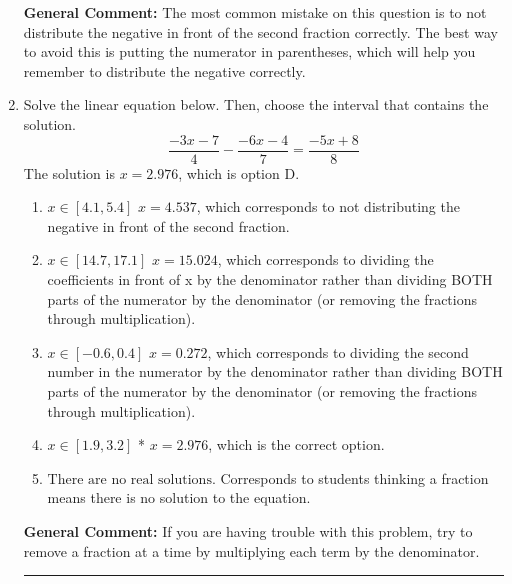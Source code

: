 \documentclass{extbook}[14pt]
\newcommand{\litem}[1]{\item #1

\rule{\textwidth}{0.4pt}}
\begin{document}
\begin{enumerate}
{\textbf{General Comment:} The most common mistake on this question is to not distribute the negative in front of the second fraction correctly. The best way to avoid this is putting the numerator in parentheses, which will help you remember to distribute the negative correctly.
}

\litem{
Solve the linear equation below. Then, choose the interval that contains the solution.
\[ \frac{-3x -7}{4} - \frac{-6x -4}{7} = \frac{-5x + 8}{8} \]
The solution is \( x = 2.976 \), which is option D.\begin{enumerate}[label=\Alph*.]
\item \( x \in [4.1, 5.4] \)
 $x = 4.537$, which corresponds to not distributing the negative in front of the second fraction.
\item \( x \in [14.7, 17.1] \)
 $x = 15.024$, which corresponds to dividing the coefficients in front of x by the denominator rather than dividing BOTH parts of the numerator by the denominator (or removing the fractions through multiplication).
\item \( x \in [-0.6, 0.4] \)
 $x = 0.272$, which corresponds to dividing the second number in the numerator by the denominator rather than dividing BOTH parts of the numerator by the denominator (or removing the fractions through multiplication).
\item \( x \in [1.9, 3.2] \)
* $x = 2.976$, which is the correct option.
\item \( \text{There are no real solutions.} \)
Corresponds to students thinking a fraction means there is no solution to the equation.
\end{enumerate}

\textbf{General Comment:} If you are having trouble with this problem, try to remove a fraction at a time by multiplying each term by the denominator.
}
\end{enumerate}
\end{document}
